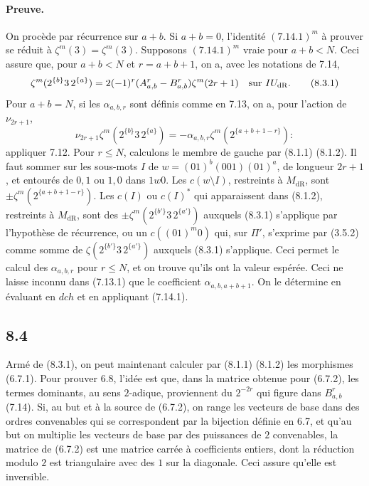 \documentclass[10pt]{article}
\newcommand{\dR}{\mathrm{dR}}
\begin{document}
\paragraph{Preuve.}
On procède par récurrence sur $a+b$. Si $a+b=0$, l'identité $(7.14.1)^m$ à prouver se réduit à $\zeta^m(3)=\zeta^m(3)$. Supposons $(7.14.1)^m$ vraie pour $a+b<N$. Ceci assure que, pour $a+b<N$ et $r=a+b+1$, on a, avec les notations de 7.14,
\begin{equation}
\zeta^m(2^{\{b\}}3\,2^{\{a\}})=2(-1)^r(A^r_{a,b}-B^r_{a,b})\zeta^m(2r+1)\quad\hbox{sur }IU_{\dR}.
\tag{8.3.1}
\end{equation}
Pour $a+b=N$, si les $\alpha_{a,b,r}$ sont définis comme en 7.13, on a, pour l'action de $\nu_{2r+1}$,
\begin{equation}
\nu_{2r+1}\zeta^m(2^{\{b\}}3\,2^{\{a\}})=-\alpha_{a,b,r}\zeta^m(2^{\{a+b+1-r\}}):
\tag{8.3.2}
\end{equation}
appliquer 7.12. Pour $r\leq N$, calculons le membre de gauche par (8.1.1) (8.1.2). Il faut sommer sur les sous-mots $I$ de $w=(01)^b(001)(01)^a$, de longueur $2r+1$, et entourés de $0,1$ ou $1,0$ dans $1w0$. Les $c(w\setminus I)$, restreints à $M_{\dR}$, sont $\pm\zeta^m(2^{\{a+b+1-r\}})$. Les $c(I)$ ou $c(I)^*$ qui apparaissent dans (8.1.2), restreints à $M_{\dR}$, sont des $\pm\zeta^m(2^{\{b'\}}3\,2^{\{a'\}})$ auxquels (8.3.1) s'applique par l'hypothèse de récurrence, ou un $c((01)^m0)$ qui, sur $\Pi'$, s'exprime par (3.5.2) comme somme de $\zeta(2^{\{b'\}}3\,2^{\{a'\}})$ auxquels (8.3.1) s'applique. Ceci permet le calcul des $\alpha_{a,b,r}$ pour $r\leq N$, et on trouve qu'ils ont la valeur espérée. Ceci ne laisse inconnu dans (7.13.1) que le coefficient $\alpha_{a,b,a+b+1}$. On le détermine en évaluant en $dch$ et en appliquant (7.14.1).

\subsection*{8.4}
Armé de (8.3.1), on peut maintenant calculer par (8.1.1) (8.1.2) les morphismes (6.7.1). Pour prouver 6.8, l'idée est que, dans la matrice obtenue pour (6.7.2), les termes dominants, au sens $2$-adique, proviennent du $2^{-2r}$ qui figure dans $B^r_{a,b}$ (7.14). Si, au but et à la source de (6.7.2), on range les vecteurs de base dans des ordres convenables qui se correspondent par la bijection définie en 6.7, et qu'au but on multiplie les vecteurs de base par des puissances de $2$ convenables, la matrice de (6.7.2) est une matrice carrée à coefficients entiers, dont la réduction modulo $2$ est triangulaire avec des $1$ sur la diagonale. Ceci assure qu'elle est inversible.
\end{document}
